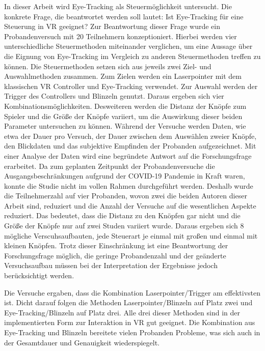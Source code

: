 In dieser Arbeit wird Eye-Tracking als Steuermöglichkeit untersucht. Die konkrete Frage, die beantwortet werden soll lautet: \glqq Ist Eye-Tracking für eine Steuerung in VR geeignet?\grqq{} Zur Beantwortung dieser Frage wurde ein Probandenversuch mit 20 Teilnehmern konzeptioniert. Hierbei werden vier unterschiedliche Steuermethoden miteinander verglichen, um eine Aussage über die Eignung von Eye-Tracking im Vergleich zu anderen Steuermethoden treffen zu können. Die Steuermethoden setzen sich aus jeweils zwei Ziel- und Auswahlmethoden zusammen. Zum Zielen werden ein Laserpointer mit dem klassischen VR Controller und Eye-Tracking verwendet. Zur Auswahl werden der Trigger des Controllers und Blinzeln genutzt. Daraus ergeben sich vier Kombinationsmöglichkeiten. Desweiteren werden die Distanz der Knöpfe zum Spieler und die Größe der Knöpfe variiert, um die Auswirkung dieser beiden Parameter untersuchen zu können. Während der Versuche werden Daten, wie etwa der Dauer pro Versuch, der Dauer zwischen dem Auswählen zweier Knöpfe, den Blickdaten und das subjektive Empfinden der Probanden aufgezeichnet. Mit einer Analyse der Daten wird eine begründete Antwort auf die Forschungsfrage erarbeitet. Da zum geplanten Zeitpunkt der Probandenversuche die Ausgangsbeschränkungen aufgrund der COVID-19 Pandemie in Kraft waren, konnte die Studie nicht im vollen Rahmen durchgeführt werden. Deshalb wurde die Teilnehmerzahl auf vier Probanden, wovon zwei die beiden Autoren dieser Arbeit sind, reduziert und die Anzahl der Versuche auf die wesentlichen Aspekte reduziert. Das bedeutet, dass die Distanz zu den Knöpfen gar nicht und die Größe der Knöpfe nur auf zwei Studen variiert wurde. Daraus ergeben sich 8 mögliche Verscuhsaufbauten, jede Steuerart je einmal mit großen und einmal mit kleinen Knöpfen. Trotz dieser Einschränkung ist eine Beantwortung der Forschungsfrage möglich, die geringe Probandenzahl und der geänderte Versuchsaufbau müssen bei der Interpretation der Ergebnisse jedoch berücksichtigt werden. 

Die Versuche ergaben, dass die Kombination Laserpointer/Trigger am effektivsten ist. Dicht darauf folgen die Methoden Laserpointer/Blinzeln auf Platz zwei und Eye-Tracking/Blinzeln auf Platz drei. Alle drei dieser Methoden sind in der implementierten Form zur Interaktion in VR gut geeignet. Die Kombination aus Eye-Tracking und Blinzeln bereitete vielen Probanden Probleme, was sich auch in der Gesamtdauer und Genauigkeit wiederspiegelt. 
